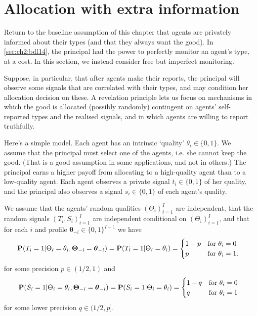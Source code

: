 \section{Allocation with extra information}
\label{sec:ch2:corr}

Return to the baseline assumption of this chapter that agents are privately informed about their types (and that they always want the good).
In \cref{sec:ch2:bdl14}, the principal had the power to perfectly monitor an agent's type, at a cost.
In this section, we instead consider free but imperfect monitoring.

Suppose, in particular, that after agents make their reports, the principal will observe some signals that are correlated with their types, and may condition her allocation decision on these.
A revelation principle lets us focus on mechanisms in which the good is allocated (possibly randomly) contingent on agents' self-reported types and the realised signals, and in which agents are willing to report truthfully.

Here's a simple model.
Each agent has an intrinsic `quality' $\theta_i \in \{0,1\}$.
We assume that the principal must select one of the agents, i.e. she cannot keep the good. (That is a good assumption in some applications, and not in others.)
The principal earns a higher payoff from allocating to a high-quality agent than to a low-quality agent.
Each agent observes a private signal $t_i \in \{0,1\}$ of her quality,
and the principal also observes a signal $s_i \in \{0,1\}$ of each agent's quality.

We assume that the agents' random qualities $(\Theta_i)_{i=1}^I$ are independent,
that the random signals $(T_i,S_i)_{i=1}^I$ are independent conditional on $(\Theta_i)_{i=1}^I$,
and that for each $i$ and profile $\boldsymbol{\theta}_{-i} \in \{0,1\}^{I-1}$ we have
%
\begin{equation*}
	\mathbf{P}( T_i=1 | \Theta_i=\theta_i, \boldsymbol{\Theta}_{-i} = \boldsymbol{\theta}_{-i} )
	= \mathbf{P}( T_i=1 | \Theta_i=\theta_i )
	= 
	\begin{cases}
		1-p	& \text{for $\theta_i=0$} \\
		p	& \text{for $\theta_i=1$.}
	\end{cases}
\end{equation*}
%
for some precision $p \in (1/2,1)$
and
%
\begin{equation*}
	\mathbf{P}( S_i=1 | \Theta_i=\theta_i, \boldsymbol{\Theta}_{-i} = \boldsymbol{\theta}_{-i} )
	= \mathbf{P}( S_i=1 | \Theta_i=\theta_i )
	= 
	\begin{cases}
		1-q	& \text{for $\theta_i=0$} \\
		q	& \text{for $\theta_i=1$}
	\end{cases}
\end{equation*}
%
for some lower precision $q \in (1/2,p]$.


